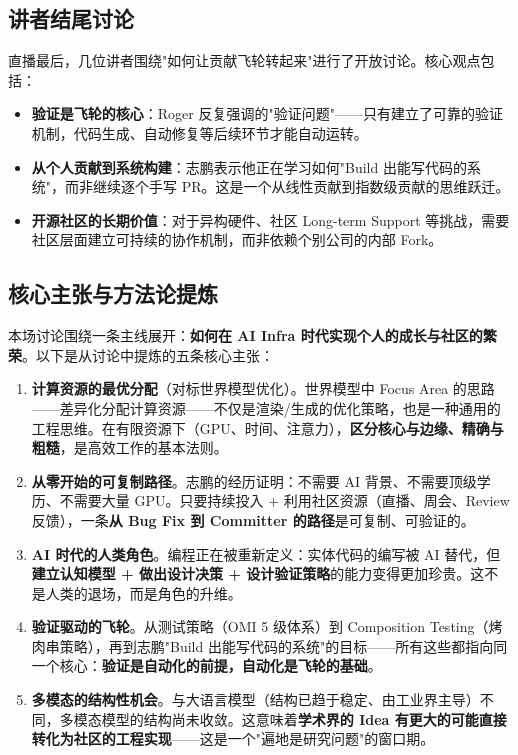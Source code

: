 \documentclass[a4paper]{article}
\begin{document}
\subsection{讲者结尾讨论}

直播最后，几位讲者围绕"如何让贡献飞轮转起来"进行了开放讨论。核心观点包括：

\begin{itemize}
\item \textbf{验证是飞轮的核心}：Roger 反复强调的"验证问题"——只有建立了可靠的验证机制，代码生成、自动修复等后续环节才能自动运转。
\item \textbf{从个人贡献到系统构建}：志鹏表示他正在学习如何"Build 出能写代码的系统"，而非继续逐个手写 PR。这是一个从线性贡献到指数级贡献的思维跃迁。
\item \textbf{开源社区的长期价值}：对于异构硬件、社区 Long-term Support 等挑战，需要社区层面建立可持续的协作机制，而非依赖个别公司的内部 Fork。
\end{itemize}

\subsection{核心主张与方法论提炼}

本场讨论围绕一条主线展开：\textbf{如何在 AI Infra 时代实现个人的成长与社区的繁荣}。以下是从讨论中提炼的五条核心主张：

\begin{enumerate}

\item \textbf{计算资源的最优分配}（对标世界模型优化）。世界模型中 Focus Area 的思路——差异化分配计算资源——不仅是渲染/生成的优化策略，也是一种通用的工程思维。在有限资源下（GPU、时间、注意力），\textbf{区分核心与边缘、精确与粗糙}，是高效工作的基本法则。

\item \textbf{从零开始的可复制路径}。志鹏的经历证明：不需要 AI 背景、不需要顶级学历、不需要大量 GPU。只要持续投入 + 利用社区资源（直播、周会、Review 反馈），一条\textbf{从 Bug Fix 到 Committer 的路径}是可复制、可验证的。

\item \textbf{AI 时代的人类角色}。编程正在被重新定义：实体代码的编写被 AI 替代，但\textbf{建立认知模型 + 做出设计决策 + 设计验证策略}的能力变得更加珍贵。这不是人类的退场，而是角色的升维。

\item \textbf{验证驱动的飞轮}。从测试策略（OMI 5 级体系）到 Composition Testing（烤肉串策略），再到志鹏"Build 出能写代码的系统"的目标——所有这些都指向同一个核心：\textbf{验证是自动化的前提，自动化是飞轮的基础}。

\item \textbf{多模态的结构性机会}。与大语言模型（结构已趋于稳定、由工业界主导）不同，多模态模型的结构尚未收敛。这意味着\textbf{学术界的 Idea 有更大的可能直接转化为社区的工程实现}——这是一个"遍地是研究问题"的窗口期。

\end{enumerate}
\end{document}
